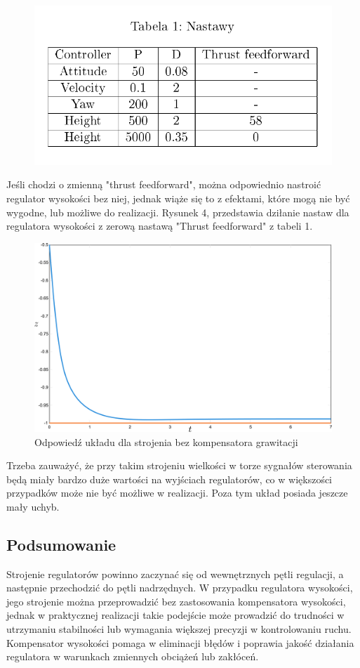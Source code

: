 \documentclass[polish,11pt,a4paper]{article}
\begin{document}
\begin{figure}[H]
	\centering
	\includegraphics[width=1\linewidth]{nastawy}
\end{figure}
Jeśli chodzi o zmienną "thrust feedforward", można odpowiednio nastroić regulator wysokości bez niej, jednak wiąże się to z
efektami, które mogą nie być wygodne, lub możliwe do realizacji. Rysunek 4, przedstawia dziłanie nastaw dla regulatora
wysokości z zerową nastawą "Thrust feedforward" z tabeli 1.

\begin{figure}[H]
	\centering
	\includegraphics[width=1\linewidth]{strojenie/z.png}
	\caption{Odpowiedź układu dla strojenia bez kompensatora grawitacji}
	\label{fig:sz}
\end{figure}

Trzeba zauważyć, że przy takim strojeniu wielkości w torze sygnałów sterowania będą miały bardzo duże wartości
na wyjściach regulatorów, co w większości przypadków może nie być możliwe w realizacji. Poza tym układ posiada jeszcze
mały uchyb.

\subsection*{Podsumowanie}
Strojenie regulatorów powinno zaczynać się od wewnętrznych pętli regulacji, a następnie przechodzić do pętli nadrzędnych. W przypadku regulatora wysokości, jego strojenie można przeprowadzić bez zastosowania kompensatora wysokości, jednak w praktycznej realizacji takie podejście może prowadzić do trudności w utrzymaniu stabilności lub wymagania większej precyzji w kontrolowaniu ruchu. Kompensator wysokości pomaga w eliminacji błędów i poprawia jakość działania regulatora w warunkach zmiennych obciążeń lub zakłóceń.
\end{document}
